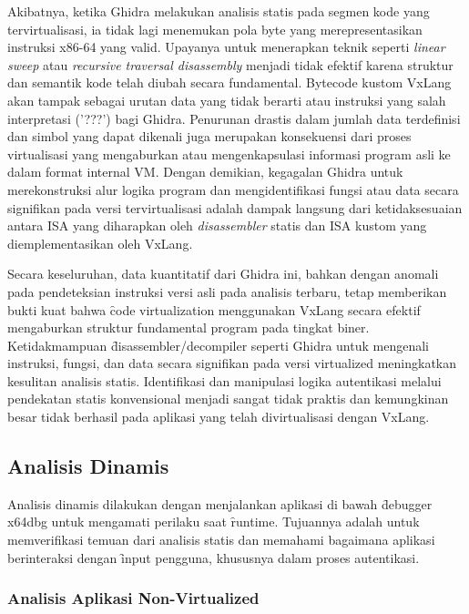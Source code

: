 Akibatnya, ketika Ghidra melakukan analisis statis pada segmen kode yang tervirtualisasi, ia tidak lagi menemukan pola byte yang merepresentasikan instruksi x86-64 yang valid. Upayanya untuk menerapkan teknik seperti \textit{linear sweep} atau \textit{recursive traversal disassembly} \cite{Ko2007} menjadi tidak efektif karena struktur dan semantik kode telah diubah secara fundamental. Bytecode kustom VxLang akan tampak sebagai urutan data yang tidak berarti atau instruksi yang salah interpretasi ('???') bagi Ghidra. Penurunan drastis dalam jumlah data terdefinisi dan simbol yang dapat dikenali juga merupakan konsekuensi dari proses virtualisasi yang mengaburkan atau mengenkapsulasi informasi program asli ke dalam format internal VM. Dengan demikian, kegagalan Ghidra untuk merekonstruksi alur logika program dan mengidentifikasi fungsi atau data secara signifikan pada versi tervirtualisasi adalah dampak langsung dari ketidaksesuaian antara ISA yang diharapkan oleh \textit{disassembler} statis dan ISA kustom yang diemplementasikan oleh VxLang.

Secara keseluruhan, data kuantitatif dari Ghidra ini, bahkan dengan anomali pada pendeteksian instruksi versi asli pada analisis terbaru, tetap memberikan bukti kuat bahwa \f{code virtualization} menggunakan VxLang secara efektif mengaburkan struktur fundamental program pada tingkat biner. Ketidakmampuan \f{disassembler/decompiler} seperti Ghidra untuk mengenali instruksi, fungsi, dan data secara signifikan pada versi virtualized meningkatkan kesulitan analisis statis. Identifikasi dan manipulasi logika autentikasi melalui pendekatan statis konvensional menjadi sangat tidak praktis dan kemungkinan besar tidak berhasil pada aplikasi yang telah divirtualisasi dengan VxLang.

\subsection{Analisis Dinamis}
Analisis dinamis dilakukan dengan menjalankan aplikasi di bawah \f{debugger} x64dbg untuk mengamati perilaku saat \f{runtime}. Tujuannya adalah untuk memverifikasi temuan dari analisis statis dan memahami bagaimana aplikasi berinteraksi dengan \f{input} pengguna, khususnya dalam proses autentikasi.

\subsubsection{Analisis Aplikasi Non-Virtualized}

